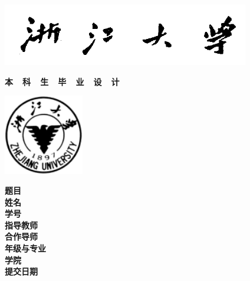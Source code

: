 {
  \setlength{\parindent}{0em}

  {
    \linespread{1}

    \vspace*{-1em}

    \begin{center}
      \includegraphics[width=108mm]{images/xiaoming}
    \end{center}

    \vspace{-1.5em}

    {
      \songti\erhao\bfseries
      \centering
      本~~科~~生~~毕~~业~~设~~计 \par
    }

    \vspace{1em}

    \begin{center}
      \includegraphics[width=35mm]{images/xiaobiao}
    \end{center}
  }

  \vspace{9em}

  {
    \linespread{1.6}
    \songti\sanhao\bfseries
    \centering
    \newlength{\titlelength}
    \setlength{\titlelength}{22em}
    题目 \; \underline{\makebox[\titlelength]{\zjutitlec}} \\
    姓名 \; \underline{\makebox[\titlelength]{\zjuauthornamec}} \\
    学号 \; \underline{\makebox[\titlelength]{\zjuauthorid}} \\
    指导教师 \; \underline{\makebox[\titlelength - 2em]{\zjumentorc}} \\
    合作导师 \; \underline{} \\
    年级与专业 \; \underline{\makebox[\titlelength - 3em]{\zjugrade \; \zjumajorc}} \\
    学院 \; \underline{\makebox[\titlelength]{\zjucollegec}} \\
    提交日期 \; \underline{\makebox[\titlelength - 2em]{\zjudatec}} \par
  }
}
